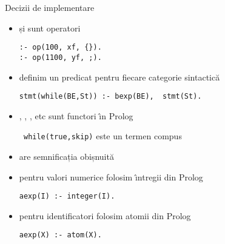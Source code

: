 \documentclass[xcolor=x11names,compress,10pt]{beamer}
\begin{document}
\begin{frame}[fragile]{Decizii de implementare}
\vspace*{0.5cm}

\begin{itemize}
\item  \intens{\texttt{$\{\}$}} și \intens{\texttt{;}} sunt operatori
\begin{verbatim}
:- op(100, xf, {}).
:- op(1100, yf, ;).
\end{verbatim}
\medskip

\item definim un predicat pentru fiecare categorie 
sintactică

\begin{verbatim}
stmt(while(BE,St)) :- bexp(BE),  stmt(St).
\end{verbatim}
\medskip

\item {}, , 
, etc  sunt functori \^{\i}n Prolog 

{\texttt{ while(true,skip)}} este un termen compus

\medskip

\item \intens{,} are semnificația obișnuită
\medskip

\item  pentru valori numerice folosim \^{\i}ntregii din Prolog
\begin{verbatim}
aexp(I) :- integer(I).
\end{verbatim}
\medskip

\item  pentru identificatori folosim atomii din Prolog
\begin{verbatim}
aexp(X) :- atom(X).
\end{verbatim}

\end{itemize}


\end{frame}
\end{document}
